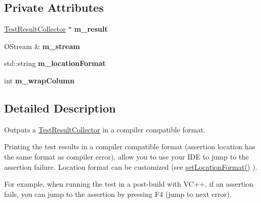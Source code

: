 \subsection*{Private Attributes}
\begin{DoxyCompactItemize}
\item 
\hyperlink{class_test_result_collector}{Test\+Result\+Collector} $\ast$ {\bfseries m\+\_\+result}\hypertarget{class_compiler_outputter_a0b2dda27a5d299a8d7d409fad6618134}{}\label{class_compiler_outputter_a0b2dda27a5d299a8d7d409fad6618134}

\item 
O\+Stream \& {\bfseries m\+\_\+stream}\hypertarget{class_compiler_outputter_a06c4b436ca44003bce241f791964a88e}{}\label{class_compiler_outputter_a06c4b436ca44003bce241f791964a88e}

\item 
std\+::string {\bfseries m\+\_\+location\+Format}\hypertarget{class_compiler_outputter_aba3ee99abd3f0e4f809a9a415e4b7be5}{}\label{class_compiler_outputter_aba3ee99abd3f0e4f809a9a415e4b7be5}

\item 
int {\bfseries m\+\_\+wrap\+Column}\hypertarget{class_compiler_outputter_aaa0b38b00d1eb5535db3498bc953d88f}{}\label{class_compiler_outputter_aaa0b38b00d1eb5535db3498bc953d88f}

\end{DoxyCompactItemize}


\subsection{Detailed Description}
Outputs a \hyperlink{class_test_result_collector}{Test\+Result\+Collector} in a compiler compatible format.

Printing the test results in a compiler compatible format (assertion location has the same format as compiler error), allow you to use your I\+DE to jump to the assertion failure. Location format can be customized (see \hyperlink{class_compiler_outputter_a0d9e67c7bdcb443b0b2754d61a10790c}{set\+Location\+Format()} ). 

For example, when running the test in a post-\/build with V\+C++, if an assertion fails, you can jump to the assertion by pressing F4 (jump to next error).

